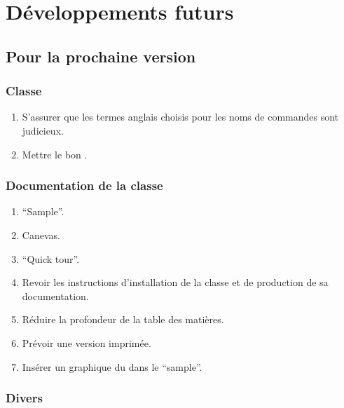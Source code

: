 \chapter{Développements futurs}\label{cha:devel-futurs}

\section{Pour la prochaine version}
\label{sec:pour-la-prochaine}

\subsection{Classe}
\label{sec:classe}

\begin{enumerate}
\item S'assurer que les termes anglais choisis pour les noms de commandes sont
  judicieux.
\item Mettre le bon .
\end{enumerate}

\subsection{Documentation de la classe}
\label{sec:documentation-de-la}

\begin{enumerate}
\item \foreignquote{english}{Sample}.
\item Canevas.
\item \foreignquote{english}{Quick tour}.
\item Revoir les instructions d'installation de la classe et de production de
  sa documentation.
\item Réduire la profondeur de la table des matières.
\item Prévoir une version imprimée.
\item Insérer un graphique du  dans le \foreignquote{english}{sample}.
\end{enumerate}

\subsection{Divers}
\label{sec:TODO-divers}

